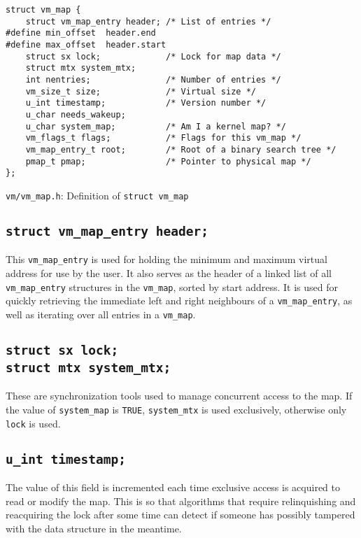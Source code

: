 \documentclass[shortabstract, english]{iithesis}
\begin{document}
\begin{listing}[H]
\begin{verbatim}
struct vm_map {
    struct vm_map_entry header; /* List of entries */
#define min_offset  header.end
#define max_offset  header.start
    struct sx lock;             /* Lock for map data */
    struct mtx system_mtx;
    int nentries;               /* Number of entries */
    vm_size_t size;             /* Virtual size */
    u_int timestamp;            /* Version number */
    u_char needs_wakeup;
    u_char system_map;          /* Am I a kernel map? */
    vm_flags_t flags;           /* Flags for this vm_map */
    vm_map_entry_t root;        /* Root of a binary search tree */
    pmap_t pmap;                /* Pointer to physical map */
};
\end{verbatim}
\caption{\texttt{vm/vm\_map.h}: Definition of \texttt{struct vm_map}}
\end{listing}

\subsection*{\texttt{struct vm_map_entry header;}}
This \texttt{vm_map_entry} is used for holding the minimum and maximum virtual
address for use by the user. It also serves as the header of a linked list of
all \texttt{vm_map_entry} structures in the \texttt{vm_map}, sorted by start
address. It is used for quickly retrieving the immediate left and right
neighbours of a \texttt{vm_map_entry}, as well as iterating over all entries
in a \texttt{vm_map}.

\subsection*{\texttt{struct sx lock;}\\
  \texttt{struct mtx system_mtx;}}
These are synchronization tools used to manage concurrent access to the map. If
the value of \texttt{system_map} is \texttt{TRUE}, \texttt{system_mtx} is used
exclusively, otherwise only \texttt{lock} is used.

\subsection*{\texttt{u_int timestamp;}}
The value of this field is incremented each time exclusive access is acquired to
read or modify the map. This is so that algorithms that require relinquishing
and reacquiring the lock after some time can detect if someone has possibly
tampered with the data structure in the meantime.
\end{document}
